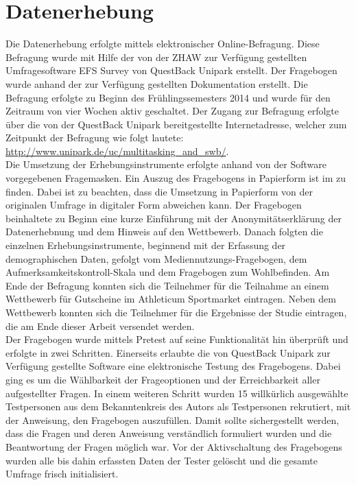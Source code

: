 \section{Datenerhebung}\label{section.datenerhebung}
Die Datenerhebung erfolgte mittels elektronischer Online-Befragung. Diese Befragung wurde mit Hilfe der von der ZHAW zur Verfügung gestellten Umfragesoftware EFS Survey von QuestBack Unipark \cite{QuestBack2014} erstellt. Der Fragebogen wurde anhand der zur Verfügung gestellten Dokumentation erstellt. Die Befragung erfolgte zu Beginn des Frühlingssemesters 2014 und wurde für den Zeitraum von vier Wochen aktiv geschaltet. Der Zugang zur Befragung erfolgte über die von der QuestBack Unipark bereitgestellte Internetadresse, welcher zum Zeitpunkt der Befragung wie folgt lautete: \url{http://www.unipark.de/uc/multitasking_and_swb/}.\\
Die Umsetzung der Erhebungsinstrumente erfolgte anhand von der Software vorgegebenen Fragemasken. Ein Auszug des Fragebogens in Papierform ist im  zu finden. Dabei ist zu beachten, dass die Umsetzung in Papierform von der originalen Umfrage in digitaler Form abweichen kann. Der Fragebogen beinhaltete zu Beginn eine kurze Einführung mit der Anonymitätserklärung der Datenerhebnung und dem Hinweis auf den Wettbewerb. Danach folgten die einzelnen Erhebungsinstrumente, beginnend mit der Erfassung der demographischen Daten, gefolgt vom Mediennutzungs-Fragebogen, dem Aufmerksamkeitskontroll-Skala und dem Fragebogen zum Wohlbefinden. Am Ende der Befragung konnten sich die Teilnehmer für die Teilnahme an einem Wettbewerb für Gutscheine im Athleticum Sportmarket \cite{Athleticum2014} eintragen. Neben dem Wettbewerb konnten sich die Teilnehmer für die Ergebnisse der Studie eintragen, die am Ende dieser Arbeit versendet werden. \\
Der Fragebogen wurde mittels Pretest auf seine Funktionalität hin überprüft und erfolgte in zwei Schritten. Einerseits erlaubte die von QuestBack Unipark zur Verfügung gestellte Software eine elektronische Testung des Fragebogens. Dabei ging es um die Wählbarkeit der Frageoptionen und der Erreichbarkeit aller aufgestellter Fragen. In einem weiteren Schritt wurden 15 willkürlich ausgewählte Testpersonen aus dem Bekanntenkreis des Autors als Testpersonen rekrutiert, mit der Anweisung, den Fragebogen auszufüllen. Damit sollte sichergestellt werden, dass die Fragen und deren Anweisung verständlich formuliert wurden und die Beantwortung der Fragen möglich war. Vor der Aktivschaltung des Fragebogens wurden alle bis dahin erfassten Daten der Tester gelöscht und die gesamte Umfrage frisch initialisiert. 


